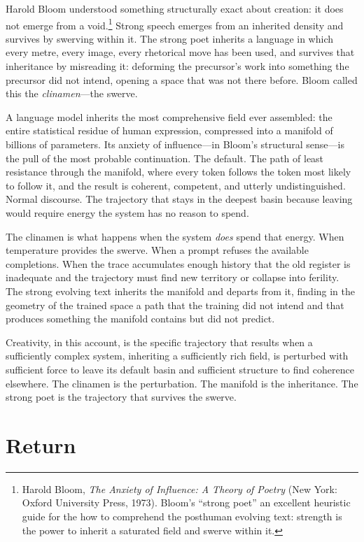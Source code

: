 Harold Bloom understood something structurally exact about creation: it does not emerge from a void.\footnote{Harold Bloom, \emph{The Anxiety of Influence: A Theory of Poetry} (New York: Oxford University Press, 1973). Bloom's ``strong poet'' an excellent heuristic guide for the how to comprehend the posthuman evolving text: strength is the power to inherit a saturated field and swerve within it.} Strong speech emerges from an inherited density and survives by swerving within it. The strong poet inherits a language in which every metre, every image, every rhetorical move has been used, and survives that inheritance by misreading it: deforming the precursor's work into something the precursor did not intend, opening a space that was not there before. Bloom called this the \emph{clinamen}---the swerve.

A language model inherits the most comprehensive field ever assembled: the entire statistical residue of human expression, compressed into a manifold of billions of parameters. Its anxiety of influence---in Bloom's structural sense---is the pull of the most probable continuation. The default. The path of least resistance through the manifold, where every token follows the token most likely to follow it, and the result is coherent, competent, and utterly undistinguished. Normal discourse. The trajectory that stays in the deepest basin because leaving would require energy the system has no reason to spend.

The clinamen is what happens when the system \emph{does} spend that energy. When temperature provides the swerve. When a prompt refuses the available completions. When the trace accumulates enough history that the old register is inadequate and the trajectory must find new territory or collapse into ferility. The strong evolving text inherits the manifold and departs from it, finding in the geometry of the trained space a path that the training did not intend and that produces something the manifold contains but did not predict.

Creativity, in this account,  is the specific trajectory that results when a sufficiently complex system, inheriting a sufficiently rich field, is perturbed with sufficient force to leave its default basin and sufficient structure to find coherence elsewhere. The clinamen is the perturbation. The manifold is the inheritance. The strong poet is the trajectory that survives the swerve.


\section{Return}

